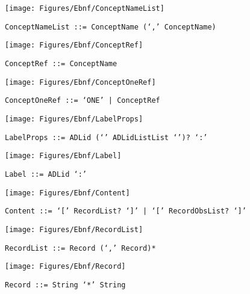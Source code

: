  \begin{figure}[H]
  \centering
  \texttt{[image: Figures/Ebnf/ConceptNameList]}
  \caption*{\texttt{ConceptNameList \small::=  ConceptName (`,' ConceptName)}}
  \label{fig:ebnf-ConceptNameList}
 \end{figure}

 \begin{figure}[H]
  \centering
  \texttt{[image: Figures/Ebnf/ConceptRef]}
  \caption*{\texttt{ConceptRef \small::=  ConceptName}}
  \label{fig:ebnf-ConceptRef}
 \end{figure}

 \begin{figure}[H]
  \centering
  \texttt{[image: Figures/Ebnf/ConceptOneRef]}
  \caption*{\texttt{ConceptOneRef \small::=  `ONE' | ConceptRef}}
  \label{fig:ebnf-ConceptOneRef}
 \end{figure}

 \begin{figure}[H]
  \centering
  \texttt{[image: Figures/Ebnf/LabelProps]}
  \caption*{\texttt{LabelProps \small::=  ADLid (`{' ADLidListList `}')? `:'}}
  \label{fig:ebnf-LabelProps}
 \end{figure}

 \begin{figure}[H]
  \centering
  \texttt{[image: Figures/Ebnf/Label]}
  \caption*{\texttt{Label \small::=  ADLid `:'}}
  \label{fig:ebnf-Label}
 \end{figure}

 \begin{figure}[H]
  \centering
  \texttt{[image: Figures/Ebnf/Content]}
  \caption*{\texttt{Content \small::=  `[' RecordList? `]' | `[' RecordObsList? `]'}}
  \label{fig:ebnf-Content}
 \end{figure}

 \begin{figure}[H]
  \centering
  \texttt{[image: Figures/Ebnf/RecordList]}
  \caption*{\texttt{RecordList \small::=  Record (`,' Record)*}}
  \label{fig:ebnf-RecordList}
 \end{figure}

 \begin{figure}[H]
  \centering
  \texttt{[image: Figures/Ebnf/Record]}
  \caption*{\texttt{Record \small::=  String `*' String}}
  \label{fig:ebnf-Record}
 \end{figure}

